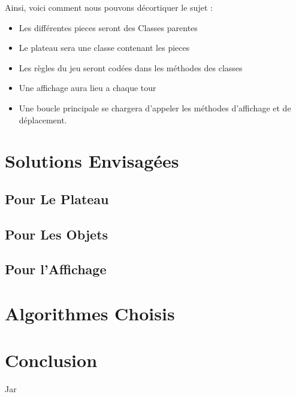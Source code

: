 \documentclass[titlepage]{report}
\begin{document}
\noindent Ainsi, voici comment nous pouvons décortiquer le sujet :\\
\begin{itemize}[label=$\bullet$] 
    \item Les différentes pieces seront des Classes parentes
    \item Le plateau sera une classe contenant les pieces
    \item Les règles du jeu seront codées dans les méthodes des classes
    \item Une affichage aura lieu a chaque tour
    \item Une boucle principale se chargera d'appeler les méthodes d'affichage et de déplacement.
\end{itemize}

\section{Solutions Envisagées}

\subsection{Pour Le Plateau}
\subsection{Pour Les Objets}
\subsection{Pour l’Affichage}

\section{Algorithmes Choisis}

\section{Conclusion}
Jar
\end{document}
